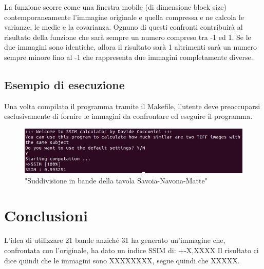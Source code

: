 \documentclass[a4paper,11pt]{article}
\begin{document}
    La funzione scorre come una finestra mobile (di dimensione block size) contemporaneamente l'immagine originale e quella compressa e ne calcola le varianze, le medie e la covarianza. 
    Ognuno di questi confronti contribuirà al risultato della funzione che sarà sempre un numero compreso tra -1 ed 1.
    Se le due immagini sono identiche, allora il risultato sarà 1 altrimenti sarà un numero sempre minore fino al -1 che rappresenta due immagini completamente diverse.

    \subsection{Esempio di esecuzione}
    Una volta compilato il programma tramite il Makefile, l'utente deve preoccuparsi esclusivamente di fornire le immagini da confrontare ed eseguire il programma.
    \begin{figure}[h]
        \centering
        \includegraphics[scale=0.9]{esempio}
        \caption{"Suddivisione in bande della tavola Savoia-Navona-Matte"}
    \end{figure}
    \newpage
    \section{Conclusioni} 
    L'idea di utilizzare 21 bande anziché 31 ha generato un'immagine che, confrontata con l'originale, ha dato un indice SSIM di:
    +-X,XXXX
    Il risultato ci dice quindi che le immagini sono XXXXXXXX, segue quindi che XXXXX.
  
\end{document}
